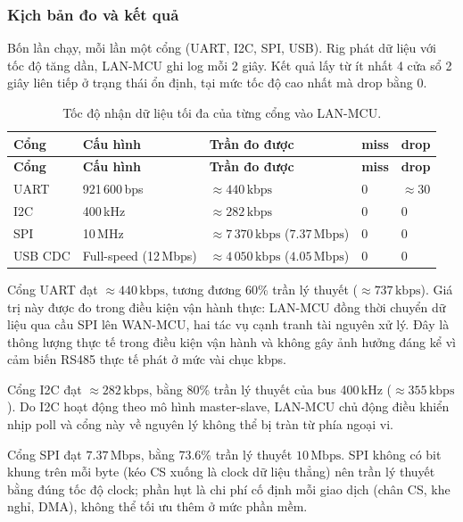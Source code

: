\subsubsection{Kịch bản đo và kết quả}

Bốn lần chạy, mỗi lần một cổng (UART, I2C, SPI, USB). Rig phát dữ liệu với tốc độ tăng dần, LAN-MCU ghi log mỗi 2 giây. Kết quả lấy từ ít nhất 4 cửa sổ 2 giây liên tiếp ở trạng thái ổn định, tại mức tốc độ cao nhất mà drop bằng 0.

\begin{longtable}{|p{2.5cm}|p{3cm}|p{5cm}|p{1.25cm}|p{1.25cm}|}
    \caption{Tốc độ nhận dữ liệu tối đa của từng cổng vào LAN-MCU.}
    \label{tab:lan_ceiling} \\
    \hline
    \textbf{Cổng} & \textbf{Cấu hình} & \textbf{Trần đo được} & \textbf{miss} & \textbf{drop} \\ \hline
    \endfirsthead
    \hline
    \textbf{Cổng} & \textbf{Cấu hình} & \textbf{Trần đo được} & \textbf{miss} & \textbf{drop} \\ \hline
    \endhead
    \hline
    \endfoot
    \endlastfoot
    UART & 921\,600\,bps & $\approx 440\,\text{kbps}$ & 0 & $\approx 30$ \\ \hline
    I2C & 400\,kHz & $\approx 282\,\text{kbps}$ & 0 & 0 \\ \hline
    SPI & 10\,MHz & $\approx 7\,370\,\text{kbps}$ ($7{.}37\,\text{Mbps}$) & 0 & 0 \\ \hline
    USB CDC & Full-speed (12\,Mbps) & $\approx 4\,050\,\text{kbps}$ ($4{.}05\,\text{Mbps}$) & 0 & 0 \\ \hline
\end{longtable}

Cổng UART đạt $\approx 440\,\text{kbps}$, tương đương 60\% trần lý thuyết ($\approx 737\,\text{kbps}$). Giá trị này được đo trong điều kiện vận hành thực: LAN-MCU đồng thời chuyển dữ liệu qua cầu SPI lên WAN-MCU, hai tác vụ cạnh tranh tài nguyên xử lý. Đây là thông lượng thực tế trong điều kiện vận hành và không gây ảnh hưởng đáng kể vì cảm biến RS485 thực tế phát ở mức vài chục kbps.

Cổng I2C đạt $\approx 282\,\text{kbps}$, bằng 80\% trần lý thuyết của bus 400\,kHz ($\approx 355\,\text{kbps}$). Do I2C hoạt động theo mô hình master-slave, LAN-MCU chủ động điều khiển nhịp poll và cổng này về nguyên lý không thể bị tràn từ phía ngoại vi.

Cổng SPI đạt $7{.}37\,\text{Mbps}$, bằng 73{.}6\% trần lý thuyết $10\,\text{Mbps}$. SPI không có bit khung trên mỗi byte (kéo CS xuống là clock dữ liệu thẳng) nên trần lý thuyết bằng đúng tốc độ clock; phần hụt là chi phí cố định mỗi giao dịch (chân CS, khe nghỉ, DMA), không thể tối ưu thêm ở mức phần mềm.


